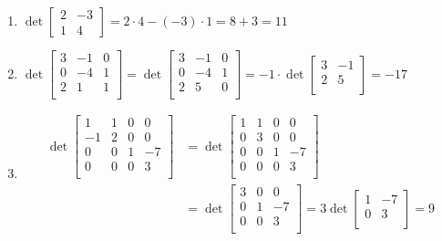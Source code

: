 \documentclass{article}
\begin{document}
\begin{enumerate}
    \item $
        \det\begin{bmatrix}2 & -3 \\ 1 & 4\end{bmatrix} =
        2 \cdot 4 - (-3) \cdot 1 = 8 + 3 = 11
    $
    \item $
        \det\begin{bmatrix}
            3 & -1 & 0 \\
            0 & -4 & 1 \\
            2 & 1 & 1 \\
        \end{bmatrix} = \det\begin{bmatrix}
            3 & -1 & 0 \\
            0 & -4 & 1 \\
            2 & 5 & 0 \\
        \end{bmatrix} = -1 \cdot \det\begin{bmatrix}
            3 & -1 \\
            2 &  5 \\
        \end{bmatrix} = -17
    $
    \item \[\begin{aligned}
        \det\begin{bmatrix}
            1 & 1 & 0 & 0 \\
            -1 & 2 & 0 & 0 \\
            0 & 0 & 1 & -7 \\
            0 & 0 & 0 & 3 \\
        \end{bmatrix} &= \det\begin{bmatrix}
            1 & 1 & 0 & 0 \\
            0 & 3 & 0 & 0 \\
            0 & 0 & 1 & -7 \\
            0 & 0 & 0 & 3 \\
        \end{bmatrix} \\ &= \det\begin{bmatrix}
            3 & 0 & 0 \\
            0 & 1 & -7 \\
            0 & 0 & 3 \\
        \end{bmatrix} = 3 \det\begin{bmatrix}
            1 & -7 \\
            0 & 3 \\
        \end{bmatrix} = 9
    \end{aligned}\]
\end{enumerate}
\end{document}
